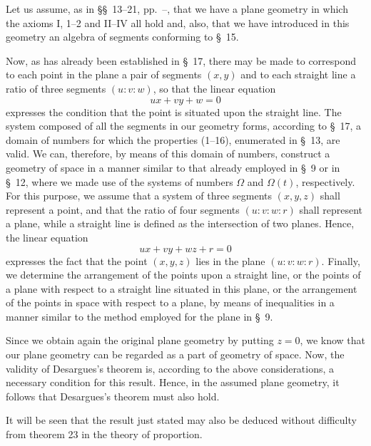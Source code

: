 \documentclass[11pt,oneside]{book}
\begin{document}
Let us assume, as in \S\S~13--21, pp.~\pageref{folio37}--\pageref{folio70}, that we
have a plane geometry in which the axioms I, 1--2 and
II--IV all hold and, also, that we have introduced in
this geometry an algebra of segments conforming to
\S~15.

Now, as has already been established in \S~17, there
may be made to correspond to each point in the plane
a pair of segments $(x, y)$ and to each straight line a
ratio of three segments $(u:v:w)$, so that the linear
equation
\[
  ux+vy+w=0
\]
expresses the condition that the point is situated upon
the straight line. The system composed of all the
segments in our geometry forms, according to \S~17, a
domain of numbers for which the properties (1--16),
enumerated in \S~13, are valid. We can, therefore, by
means of this domain of numbers, construct a
geometry of space in a manner similar to that already
employed in \S~9 or in \S~12, where we made use of the
systems of numbers $\Omega$ and $\Omega(t)$, respectively. For
this purpose, we assume that a system of three
segments $(x, y, z)$ shall represent a point, and that the
ratio of four segments $(u:v:w:r)$ shall represent a
plane, while a straight line is defined as the
intersection of two planes. Hence, the linear equation
\[
ux+vy+wz+r = 0
\]
expresses the fact that the point $(x, y, z)$ lies in the
plane $(u: v: w: r)$. Finally, we determine the
arrangement of the points upon a straight line, or the points
of a plane with respect to a straight line situated in
this plane, or the arrangement of the points in space
with respect to a plane, by means of inequalities in a
manner similar to the method employed for the plane
in \S~9.

Since we obtain again the original plane geometry
by putting $z=0$, we know that our plane geometry
can be regarded as a part of geometry of space. Now,
the validity of Desargues's theorem is, according to the
above considerations, a necessary condition for this
result.  Hence, in the assumed plane geometry, it
follows that Desargues's theorem must also hold.

It will be seen that the result just stated may also
be deduced without difficulty from theorem 23 in the
theory of proportion.

\label{p23}
\end{document}
